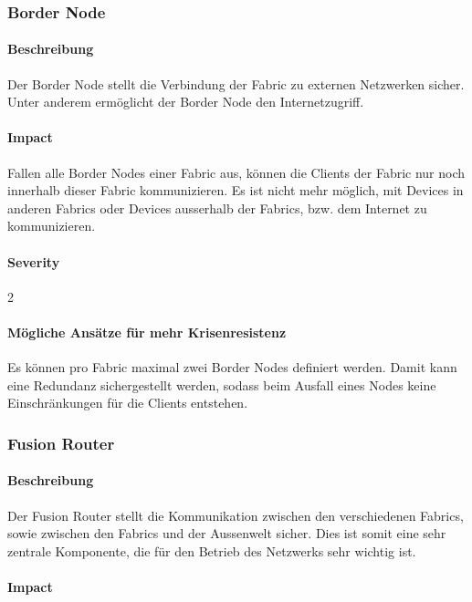 \subsubsection{Border Node}

\paragraph{Beschreibung}

Der Border Node stellt die Verbindung der Fabric zu externen Netzwerken sicher. Unter anderem ermöglicht der Border Node den Internetzugriff.

\paragraph{Impact}

Fallen alle Border Nodes einer Fabric aus, können die Clients der Fabric nur noch innerhalb dieser Fabric kommunizieren. Es ist nicht mehr möglich, mit Devices in anderen Fabrics oder Devices ausserhalb der Fabrics, bzw. dem Internet zu kommunizieren.

\paragraph{Severity} 2

\paragraph{Mögliche Ansätze für mehr Krisenresistenz}

Es können pro Fabric maximal zwei Border Nodes definiert werden. Damit kann eine Redundanz sichergestellt werden, sodass beim Ausfall eines Nodes keine Einschränkungen für die Clients entstehen. 

\subsubsection{Fusion Router}

\paragraph{Beschreibung}

Der Fusion Router stellt die Kommunikation zwischen den verschiedenen Fabrics, sowie zwischen den Fabrics und der Aussenwelt sicher. Dies ist somit eine sehr zentrale Komponente, die für den Betrieb des Netzwerks sehr wichtig ist.

\paragraph{Impact}

